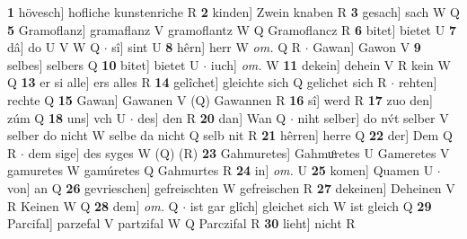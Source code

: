 \documentclass[8pt,a4paper,notitlepage]{article}
\begin{document}
\begin{table}[ht]
\begin{minipage}[t]{0.5\linewidth}
\textbf{1} hövesch] hofliche kunstenriche R \textbf{2} kinden] Zwein knaben R \textbf{3} gesach] sach W Q \textbf{5} Gramoflanz] gramaflanz V gramoflantz W Q Gramoflancz R \textbf{6} bitet] bietet U \textbf{7} dâ] do U V W Q  $\cdot$ sî] sint U \textbf{8} hêrn] herr W \textit{om.} Q R  $\cdot$ Gawan] Gawon V \textbf{9} selbes] selbers Q \textbf{10} bitet] bietet U  $\cdot$ iuch] \textit{om.} W \textbf{11} dekein] dehein V R kein W Q \textbf{13} er si alle] ers alles R \textbf{14} gelîchet] gleichte sich Q gelichet sich R  $\cdot$ rehten] rechte Q \textbf{15} Gawan] Gawanen V (Q) Gawannen R \textbf{16} sî] werd R \textbf{17} zuo den] zúm Q \textbf{18} uns] vch U  $\cdot$ des] den R \textbf{20} dan] Wan Q  $\cdot$ niht selber] do nv́t selber V selber do nicht W selbe da nicht Q selb nit R \textbf{21} hêrren] herre Q \textbf{22} der] Dem Q R  $\cdot$ dem sige] des syges W (Q) (R) \textbf{23} Gahmuretes] Gahmuͦretes U Gameretes V gamuretes W gamúretes Q Gahmurtes R \textbf{24} in] \textit{om.} U \textbf{25} komen] Quamen U  $\cdot$ von] an Q \textbf{26} gevrieschen] gefreischten W gefreischen R \textbf{27} dekeinen] Deheinen V R Keinen W Q \textbf{28} dem] \textit{om.} Q  $\cdot$ ist gar glîch] gleichet sich W ist gleich Q \textbf{29} Parcifal] parzefal V partzifal W Q Parczifal R \textbf{30} lieht] nicht R \newline
\end{minipage}
\end{table}
\end{document}
